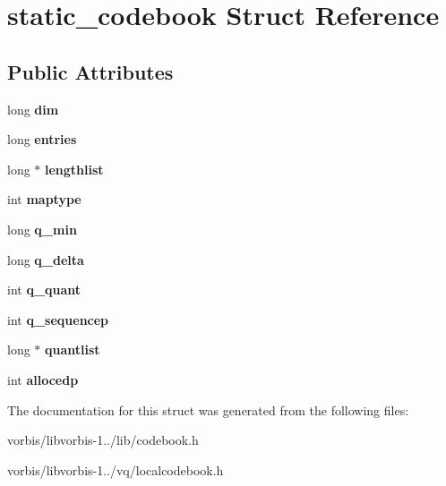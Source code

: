 \hypertarget{structstatic__codebook}{\section{static\+\_\+codebook Struct Reference}
\label{structstatic__codebook}
}
\subsection*{Public Attributes}
\begin{DoxyCompactItemize}
\item 
\hypertarget{structstatic__codebook_ad054a29cfda0a663e6c20c880a247300}{long {\bfseries dim}}\label{structstatic__codebook_ad054a29cfda0a663e6c20c880a247300}

\item 
\hypertarget{structstatic__codebook_af672cb700b32f865aa6b3a8807e6bcaf}{long {\bfseries entries}}\label{structstatic__codebook_af672cb700b32f865aa6b3a8807e6bcaf}

\item 
\hypertarget{structstatic__codebook_a21d2a561788023117e66d178fd41801b}{long $\ast$ {\bfseries lengthlist}}\label{structstatic__codebook_a21d2a561788023117e66d178fd41801b}

\item 
\hypertarget{structstatic__codebook_a818d20b21c9c6c1d9472a09c4b063794}{int {\bfseries maptype}}\label{structstatic__codebook_a818d20b21c9c6c1d9472a09c4b063794}

\item 
\hypertarget{structstatic__codebook_a8f11e73cd9db46a04fb86743f078a27c}{long {\bfseries q\+\_\+min}}\label{structstatic__codebook_a8f11e73cd9db46a04fb86743f078a27c}

\item 
\hypertarget{structstatic__codebook_a94d93723dc380cd4fe483094e133ecb4}{long {\bfseries q\+\_\+delta}}\label{structstatic__codebook_a94d93723dc380cd4fe483094e133ecb4}

\item 
\hypertarget{structstatic__codebook_aaf7234dd01a51b7a70e3ab06122ee7ca}{int {\bfseries q\+\_\+quant}}\label{structstatic__codebook_aaf7234dd01a51b7a70e3ab06122ee7ca}

\item 
\hypertarget{structstatic__codebook_aae1321f5435c0b33f22beb66636aa3b2}{int {\bfseries q\+\_\+sequencep}}\label{structstatic__codebook_aae1321f5435c0b33f22beb66636aa3b2}

\item 
\hypertarget{structstatic__codebook_ae21b02047f7e9fb30a72ad1c41c92426}{long $\ast$ {\bfseries quantlist}}\label{structstatic__codebook_ae21b02047f7e9fb30a72ad1c41c92426}

\item 
\hypertarget{structstatic__codebook_a9992fc79beaacce326a6b6cc4b7f0ef9}{int {\bfseries allocedp}}\label{structstatic__codebook_a9992fc79beaacce326a6b6cc4b7f0ef9}

\end{DoxyCompactItemize}


The documentation for this struct was generated from the following files\+:\begin{DoxyCompactItemize}
\item 
vorbis/libvorbis-\/1../lib/codebook.\+h\item 
vorbis/libvorbis-\/1../vq/localcodebook.\+h\end{DoxyCompactItemize}
